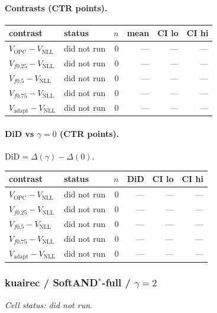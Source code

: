 \documentclass[10pt,a4paper]{article}
\begin{document}
\paragraph{Contrasts (CTR points).}
{\centering\small\begin{tabular}{llrrrr}
\toprule contrast & status & $n$ & mean & CI lo & CI hi \\
\midrule
$V_{\mathrm{OPC}}-V_{\mathrm{NLL}}$ & did not run & 0 & --- & --- & --- \\
$V_{f0.25}-V_{\mathrm{NLL}}$ & did not run & 0 & --- & --- & --- \\
$V_{f0.5}-V_{\mathrm{NLL}}$ & did not run & 0 & --- & --- & --- \\
$V_{f0.75}-V_{\mathrm{NLL}}$ & did not run & 0 & --- & --- & --- \\
$V_{\mathrm{adapt}}-V_{\mathrm{NLL}}$ & did not run & 0 & --- & --- & --- \\
\bottomrule\end{tabular}\par}
\paragraph{DiD vs $\gamma=0$ (CTR points).} $\mathrm{DiD}=\Delta(\gamma)-\Delta(0)$.
{\centering\small\begin{tabular}{llrrrr}
\toprule contrast & status & $n$ & DiD & CI lo & CI hi \\
\midrule
$V_{\mathrm{OPC}}-V_{\mathrm{NLL}}$ & did not run & 0 & --- & --- & --- \\
$V_{f0.25}-V_{\mathrm{NLL}}$ & did not run & 0 & --- & --- & --- \\
$V_{f0.5}-V_{\mathrm{NLL}}$ & did not run & 0 & --- & --- & --- \\
$V_{f0.75}-V_{\mathrm{NLL}}$ & did not run & 0 & --- & --- & --- \\
$V_{\mathrm{adapt}}-V_{\mathrm{NLL}}$ & did not run & 0 & --- & --- & --- \\
\bottomrule\end{tabular}\par}
\bigskip
\subsubsection{kuairec / SoftAND$^*$-full / $\gamma=2$}
\emph{Cell status: did not run}.
\end{document}
